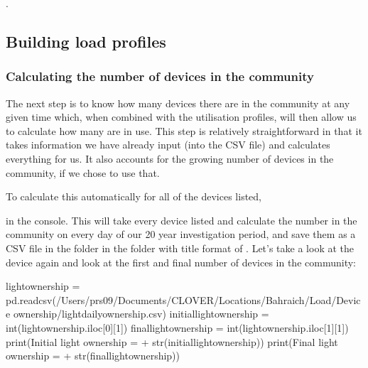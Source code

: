 \documentclass[letterpaper,10pt,english]{sphinxmanual}
\begin{document}
\sphinxAtStartPar
{}   .


\subsection{Building load profiles}
\label{\detokenize{load:building-load-profiles}}

\subsubsection{Calculating the number of devices in the community}
\label{\detokenize{load:calculating-the-number-of-devices-in-the-community}}
\sphinxAtStartPar
The next step is to know how many devices there are in the community at
any given time which, when combined with the utilisation profiles, will
then allow us to calculate how many are in use. This step is relatively
straightforward in that it takes information we have already input (into
the  CSV file) and calculates everything for us. It also
accounts for the growing number of devices in the community, if we chose
to use that.

\sphinxAtStartPar
To calculate this automatically for all of the devices listed, 

\begin{sphinxVerbatim}[commandchars=\\\{\}]
\end{sphinxVerbatim}

\sphinxAtStartPar
in the console. This will take every device listed and calculate the
number in the community on every day of our 20 year investigation
period, and save them as a CSV file in the  folder in
the  folder with title format of .
Let’s take a look at the  device again and look at the first
and final number of devices in the community:

\begin{sphinxVerbatim}[commandchars=\\\{\}]
light\PYGZus{}ownership = pd.read\PYGZus{}csv(\PYGZdq{}/Users/prs09/Documents/CLOVER/Locations/Bahraich/Load/Device ownership/light\PYGZus{}daily\PYGZus{}ownership.csv\PYGZdq{})
initial\PYGZus{}light\PYGZus{}ownership = int(light\PYGZus{}ownership.iloc[0][1])
final\PYGZus{}light\PYGZus{}ownership = int(light\PYGZus{}ownership.iloc[\PYGZhy{}1][1])
print(\PYGZsq{}Initial light ownership = \PYGZsq{}+ str(initial\PYGZus{}light\PYGZus{}ownership))
print(\PYGZsq{}Final light ownership = \PYGZsq{} + str(final\PYGZus{}light\PYGZus{}ownership))
\end{sphinxVerbatim}
\end{document}
